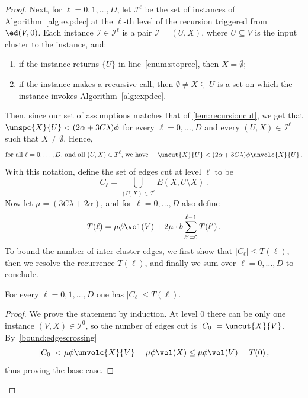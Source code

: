 \begin{proof}
	Next, for $\ell=0,1,\dots, D$, let $\mathcal{I}^\ell$ be the set of instances of Algorithm~\ref{alg:expdec} at the $\ell$-th level of the recursion triggered from $\ed(V,0)$. Each instance $\mathcal{I} \in \mathcal{I}^\ell$ is a pair $\mathcal{I}=(U,X)$, where $U \subseteq V$ is the input cluster to the instance, and:
	\begin{enumerate}
		\item \label{case:ret} if the instance returns $\{U\}$ in line~\eqref{enum:stoprec}, then $X=\emptyset$;
		\item if the instance makes a recursive call, then $\emptyset \neq X \subsetneq U$ is a set on which the instance invokes Algorithm~\ref{alg:expdec}.
	\end{enumerate}
	Then, since our set of assumptions matches that of \cref{lem:recursioncut}, we get that $\unspc{X}{U} < (2\alpha+3C\lambda)\phi$ for every $\ell = 0,\dots, D$ and every $(U,X) \in \mathcal{I}^\ell$ such that $X\neq \emptyset$. Hence,
	\begin{equation}
		\label{bound:edgescrossing}
		\text{for all $\ell = 0,\dots, D$, and all $(U,X) \in \mathcal{I}^\ell$, we have }\quad \uncut{X}{U} < (2\alpha+3C\lambda)\phi \unvolc{X}{U} \, .
	\end{equation}
	With this notation, define the set of edges cut at level $\ell$ to be
	\begin{equation*}
		C_\ell = \bigcup_{(U,X) \in \mathcal{I}^\ell} E(X,U \setminus X) \, .
	\end{equation*}
	Now let $\mu = (3C\lambda+2\alpha)$, and for $\ell=0, \dots, D$ also define
	\begin{equation*}
		T(\ell) = \mu \phi \vol(V) +2  \mu \cdot b\sum_{\ell'=0}^{\ell-1}T(\ell') \, .
	\end{equation*}
	To bound the number of inter cluster edges, we first show that $|C_\ell| \le T(\ell)$, then we resolve the recurrence $T(\ell)$, and finally we sum over $\ell=0,\dots, D$ to conclude.
	
	\begin{claim}
		\label{claim:levelcut}
		For every $\ell=0,1,\dots, D$ one has $|C_\ell| \le T(\ell)$.
	\end{claim}
\begin{proof}
	We prove the statement by induction. At level $0$ there can be only one instance $(V,X) \in \mathcal{I}^0$, so the number of edges cut is $|C_0| = \uncut{X}{V}$. By~\eqref{bound:edgescrossing}
	\begin{equation*}
		|C_0| < \mu \phi  \unvolc{X}{V} =  \mu \phi  \vol(X) \le \mu \phi \vol(V) = T(0) \, ,
	\end{equation*}
thus proving the base case.


\end{proof}
\end{proof}

